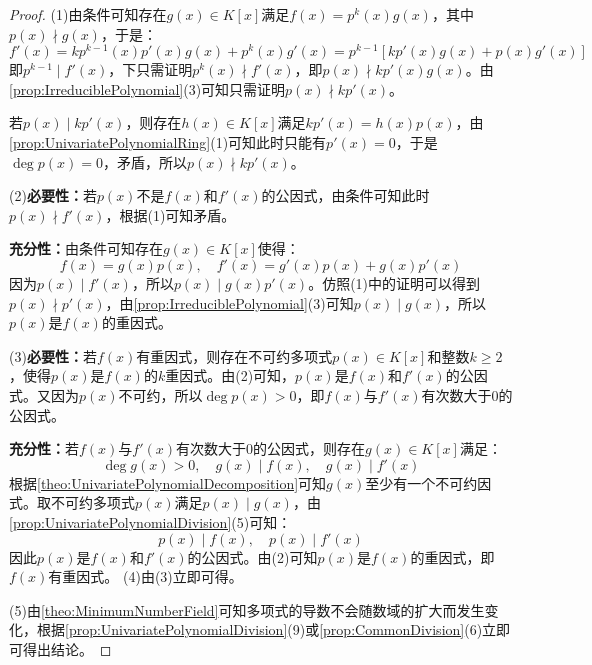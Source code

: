 \begin{proof}
	(1)由条件可知存在$g(x)\in K[x]$满足$f(x)=p^k(x)g(x)$，其中$p(x)\nmid g(x)$，于是：
	\begin{equation*}
		f'(x)=kp^{k-1}(x)p'(x)g(x)+p^k(x)g'(x)=p^{k-1}[kp'(x)g(x)+p(x)g'(x)]
	\end{equation*}
	即$p^{k-1}\mid f'(x)$，下只需证明$p^k(x)\nmid f'(x)$，即$p(x)\nmid kp'(x)g(x)$。由\cref{prop:IrreduciblePolynomial}(3)可知只需证明$p(x)\nmid kp'(x)$。\par
	若$p(x)\mid kp'(x)$，则存在$h(x)\in K[x]$满足$kp'(x)=h(x)p(x)$，由\cref{prop:UnivariatePolynomialRing}(1)可知此时只能有$p'(x)=0$，于是$\deg p(x)=0$，矛盾，所以$p(x)\nmid kp'(x)$。\par
	(2)\textbf{必要性：}若$p(x)$不是$f(x)$和$f'(x)$的公因式，由条件可知此时$p(x)\nmid f'(x)$，根据(1)可知矛盾。\par
	\textbf{充分性：}由条件可知存在$g(x)\in K[x]$使得：
	\begin{equation*}
		f(x)=g(x)p(x),\quad f'(x)=g'(x)p(x)+g(x)p'(x)
	\end{equation*}
	因为$p(x)\mid f'(x)$，所以$p(x)\mid g(x)p'(x)$。仿照(1)中的证明可以得到$p(x)\nmid p'(x)$，由\cref{prop:IrreduciblePolynomial}(3)可知$p(x)\mid g(x)$，所以$p(x)$是$f(x)$的重因式。\par
	(3)\textbf{必要性：}若$f(x)$有重因式，则存在不可约多项式$p(x)\in K[x]$和整数$k\geqslant2$，使得$p(x)$是$f(x)$的$k$重因式。由(2)可知，$p(x)$是$f(x)$和$f'(x)$的公因式。又因为$p(x)$不可约，所以$\deg p(x)>0$，即$f(x)$与$f'(x)$有次数大于$0$的公因式。\par
	\textbf{充分性：}若$f(x)$与$f'(x)$有次数大于$0$的公因式，则存在$g(x)\in K[x]$满足：
	\begin{equation*}
		\deg g(x)>0,\quad g(x)\mid f(x),\quad g(x)\mid f'(x)
	\end{equation*}
	根据\cref{theo:UnivariatePolynomialDecomposition}可知$g(x)$至少有一个不可约因式。取不可约多项式$p(x)$满足$p(x)\mid g(x)$，由\cref{prop:UnivariatePolynomialDivision}(5)可知：
	\begin{equation*}
		p(x)\mid f(x),\quad p(x)\mid f'(x)
	\end{equation*}
	因此$p(x)$是$f(x)$和$f'(x)$的公因式。由(2)可知$p(x)$是$f(x)$的重因式，即$f(x)$有重因式。
	(4)由(3)立即可得。\par
	(5)由\cref{theo:MinimumNumberField}可知多项式的导数不会随数域的扩大而发生变化，根据\cref{prop:UnivariatePolynomialDivision}(9)或\cref{prop:CommonDivision}(6)立即可得出结论。
\end{proof}